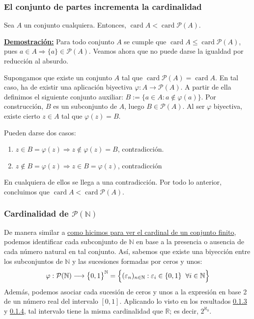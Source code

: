 \documentclass[12pt,a4paper]{article}
\newcommand{\card}{\operatorname{card}}
\newcommand{\R}{\mathbb{R}}
\newcommand{\N}{\mathbb{N}}
\newcounter{unit}[section]
\newcounter{chapter}[unit]
\renewcommand{\theunit}{\arabic{unit}}
\renewcommand{\thechapter}{\arabic{chapter}}
\renewcommand{\thesubsubsection}{\theunit.\thechapter.\arabic{subsubsection}}
\newcommand{\result}[1]{%
  \subsubsection{#1}%
  \label{result:\thesubsubsection}
}
\newcommand{\dem}{
    \noindent \underline{\textbf{Demostración:}}
}
\begin{document}
\vspace{6mm}
\result{El conjunto de partes incrementa la cardinalidad}
\hspace{3mm}
Sea $A$ un conjunto cualquiera. Entonces, $\card A < \card \mathcal{P}(A)$.

\vspace{4mm}
\dem Para todo conjunto $A$ se cumple que $\card A \leq \card \mathcal{P}(A)$,
pues $a \in A \Rightarrow \{a\} \in \mathcal{P}(A)$. Veamos ahora que no puede darse
la igualdad por reducción al absurdo.

\vspace{2mm}
Supongamos que existe un conjunto $A$ tal que $\card \mathcal{P}(A) = \card A$.
En tal caso, ha de existir una aplicación biyectiva $\varphi : A \to \mathcal{P}(A)$.
A partir de ella definimos el siguiente conjunto auxiliar: $B := \{a \in A : a \notin \varphi(a)\}$.
Por construcción, $B$ es un subconjunto de $A$, luego $B \in \mathcal{P}(A)$. Al ser $\varphi$ biyectiva,
existe cierto $z \in A$ tal que $\varphi(z) = B$.

\noindent
Pueden darse dos casos:
\begin{enumerate}[label=\arabic*.)]
    \item $z \in B = \varphi(z) \Rightarrow z \notin \varphi(z) = B$, contradicción.
    \item $z \notin B = \varphi(z) \Rightarrow z \in B = \varphi(z)$, contradicción
\end{enumerate}
En cualquiera de ellos se llega a una contradicción. Por todo lo anterior, concluimos que $\card A < \card \mathcal{P}(A)$.

\vspace{6mm}
\result{Cardinalidad de \texorpdfstring{$\mathcal{P}(\N)$}{P(N)}}
\hspace{3mm} De manera similar a \hyperref[racionales-numerables]{como hicimos para ver el cardinal de un conjunto finito}, podemos identificar cada
subconjunto de $\N$ en base a la presencia o ausencia de cada número natural en tal conjunto. Así, sabemos que existe una biyección entre los subconjuntos
de $\N$ y las sucesiones formadas por ceros y unos:
$$\varphi : \mathcal{P}(\N) \longrightarrow \big\{0,1\big\}^\N = \Big\{(\varepsilon_n)_{n \in \N} : \varepsilon_i \in \{0,1\} \hspace{2mm}  \forall i \in \N\Big\}$$
Además, podemos asociar cada sucesión de ceros y unos a la expresión en base 2 de un número real del intervalo $[0,1]$. Aplicando lo visto en los
resultados \hyperref[result:0.1.3]{0.1.3} y \hyperref[result:0.1.4]{0.1.4}, tal intervalo tiene la misma cardinalidad que $\R$; es decir, $2^{\aleph_0}$.
\end{document}
